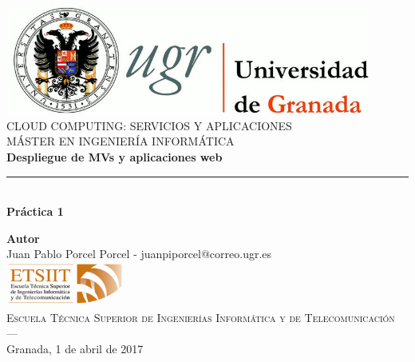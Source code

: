 \begin{titlepage}
 
 
\newlength{\centeroffset}
\setlength{\centeroffset}{-0.5\oddsidemargin}
\addtolength{\centeroffset}{0.5\evensidemargin}
\thispagestyle{empty}

\noindent\hspace*{\centeroffset}\begin{minipage}{\textwidth}

\centering
\includegraphics[width=0.9\textwidth]{images/logo_ugr.jpg}\\[1.4cm]

\textsc{ \Large CLOUD COMPUTING: SERVICIOS Y APLICACIONES\\[0.2cm]}
\textsc{ MÁSTER EN INGENIERÍA INFORMÁTICA }\\[1cm]
% 
{\Huge\bfseries Despliegue de MVs y aplicaciones web}
\noindent\rule[-1ex]{\textwidth}{3pt}\\[3.5ex]
{\large\bfseries Práctica 1}
\end{minipage}

\vspace{4.5cm}
\noindent\hspace*{\centeroffset}\begin{minipage}{\textwidth}
\centering

\textbf{Autor}\\ {Juan Pablo Porcel Porcel - juanpiporcel@correo.ugr.es}\\[1cm]
\includegraphics[width=0.3\textwidth]{images/etsiit_logo.png}\\[0.1cm]
\textsc{Escuela Técnica Superior de Ingenierías Informática y de Telecomunicación}\\
\textsc{---}\\
Granada, 1 de abril de 2017
\end{minipage}
\end{titlepage}


